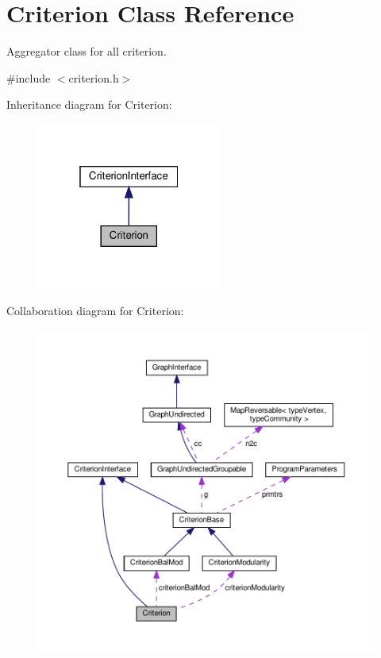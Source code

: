 \hypertarget{classCriterion}{}\section{Criterion Class Reference}
\label{classCriterion}


Aggregator class for all criterion.  




{\ttfamily \#include $<$criterion.\+h$>$}



Inheritance diagram for Criterion\+:
\nopagebreak
\begin{figure}[H]
\begin{center}
\leavevmode
\includegraphics[width=172pt]{classCriterion__inherit__graph}
\end{center}
\end{figure}


Collaboration diagram for Criterion\+:
\nopagebreak
\begin{figure}[H]
\begin{center}
\leavevmode
\includegraphics[width=350pt]{classCriterion__coll__graph}
\end{center}
\end{figure}
